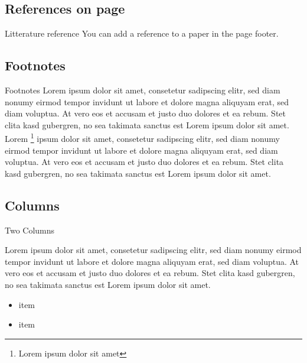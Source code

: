 \documentclass[compress]{beamer}
\begin{document}
\subsection{References on page}

{

    \begin{frame}{Litterature reference}
        You can add a reference to a paper in the page footer.
    \end{frame}
}

\subsection{Footnotes}
\begin{frame}{Footnotes}
    Lorem ipsum dolor sit amet, consetetur sadipscing elitr, sed diam nonumy
    eirmod tempor invidunt ut labore et dolore magna aliquyam erat, sed diam
    voluptua. At vero eos et accusam et justo duo dolores et ea rebum. Stet
    clita kasd gubergren, no sea takimata sanctus est Lorem ipsum dolor sit
    amet. Lorem \footnote{Lorem ipsum dolor sit amet} ipsum dolor sit amet,
    consetetur sadipscing elitr, sed diam nonumy eirmod tempor invidunt ut
    labore et dolore magna aliquyam erat, sed diam voluptua. At vero eos et
    accusam et justo duo dolores et ea rebum. Stet clita kasd gubergren, no sea
    takimata sanctus est Lorem ipsum dolor sit amet.

\end{frame}



\subsection{Columns}
\begin{frame}{Two Columns}
    \begin{multicols}{2}
        Lorem ipsum dolor sit amet, consetetur sadipscing elitr, sed diam nonumy eirmod tempor invidunt ut labore et dolore magna aliquyam erat, sed diam voluptua. At vero eos et accusam et justo duo dolores et ea rebum. Stet clita kasd gubergren, no sea takimata sanctus est Lorem ipsum dolor sit amet.
        \begin{itemize}
            \item item
            \item item
        \end{itemize}
    \end{multicols}
\end{frame}
\end{document}
